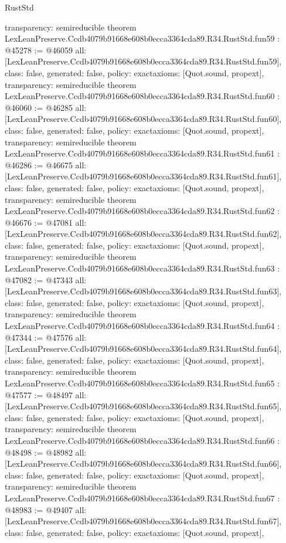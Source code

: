 \begin{lexlean}{RustStd}
\begin{coremodule}
{  transparency: semireducible
}
theorem LexLeanPreserve.Ccdb4079b91668e608b0ecca3364cda89.R34.RustStd.fun59 : @45278 := @46059 {
  all: [LexLeanPreserve.Ccdb4079b91668e608b0ecca3364cda89.R34.RustStd.fun59],
  class: false,
  generated: false,
  policy: exact{axioms: [Quot.sound, propext]},
  transparency: semireducible
}
theorem LexLeanPreserve.Ccdb4079b91668e608b0ecca3364cda89.R34.RustStd.fun60 : @46060 := @46285 {
  all: [LexLeanPreserve.Ccdb4079b91668e608b0ecca3364cda89.R34.RustStd.fun60],
  class: false,
  generated: false,
  policy: exact{axioms: [Quot.sound, propext]},
  transparency: semireducible
}
theorem LexLeanPreserve.Ccdb4079b91668e608b0ecca3364cda89.R34.RustStd.fun61 : @46286 := @46675 {
  all: [LexLeanPreserve.Ccdb4079b91668e608b0ecca3364cda89.R34.RustStd.fun61],
  class: false,
  generated: false,
  policy: exact{axioms: [Quot.sound, propext]},
  transparency: semireducible
}
theorem LexLeanPreserve.Ccdb4079b91668e608b0ecca3364cda89.R34.RustStd.fun62 : @46676 := @47081 {
  all: [LexLeanPreserve.Ccdb4079b91668e608b0ecca3364cda89.R34.RustStd.fun62],
  class: false,
  generated: false,
  policy: exact{axioms: [Quot.sound, propext]},
  transparency: semireducible
}
theorem LexLeanPreserve.Ccdb4079b91668e608b0ecca3364cda89.R34.RustStd.fun63 : @47082 := @47343 {
  all: [LexLeanPreserve.Ccdb4079b91668e608b0ecca3364cda89.R34.RustStd.fun63],
  class: false,
  generated: false,
  policy: exact{axioms: [Quot.sound, propext]},
  transparency: semireducible
}
theorem LexLeanPreserve.Ccdb4079b91668e608b0ecca3364cda89.R34.RustStd.fun64 : @47344 := @47576 {
  all: [LexLeanPreserve.Ccdb4079b91668e608b0ecca3364cda89.R34.RustStd.fun64],
  class: false,
  generated: false,
  policy: exact{axioms: [Quot.sound, propext]},
  transparency: semireducible
}
theorem LexLeanPreserve.Ccdb4079b91668e608b0ecca3364cda89.R34.RustStd.fun65 : @47577 := @48497 {
  all: [LexLeanPreserve.Ccdb4079b91668e608b0ecca3364cda89.R34.RustStd.fun65],
  class: false,
  generated: false,
  policy: exact{axioms: [Quot.sound, propext]},
  transparency: semireducible
}
theorem LexLeanPreserve.Ccdb4079b91668e608b0ecca3364cda89.R34.RustStd.fun66 : @48498 := @48982 {
  all: [LexLeanPreserve.Ccdb4079b91668e608b0ecca3364cda89.R34.RustStd.fun66],
  class: false,
  generated: false,
  policy: exact{axioms: [Quot.sound, propext]},
  transparency: semireducible
}
theorem LexLeanPreserve.Ccdb4079b91668e608b0ecca3364cda89.R34.RustStd.fun67 : @48983 := @49407 {
  all: [LexLeanPreserve.Ccdb4079b91668e608b0ecca3364cda89.R34.RustStd.fun67],
  class: false,
  generated: false,
  policy: exact{axioms: [Quot.sound, propext]},
}
\end{coremodule}
\end{lexlean}
